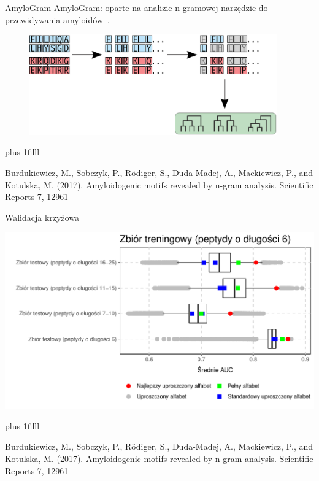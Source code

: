 \documentclass{beamer}\usepackage[]{graphicx}\usepackage[]{color}
\makeatletter
\def\maxwidth{ %
  \ifdim\Gin@nat@width>\linewidth
    \linewidth
  \else
    \Gin@nat@width
  \fi
}
\newenvironment{knitrout}{}{} %
\newcommand{\btVFill}{\vskip0pt plus 1filll}
\makeatother
\begin{document}
\begin{frame}{AmyloGram}
AmyloGram: oparte na analizie n-gramowej narzędzie do przewidywania amyloidów~\citep{burdukiewicz_prediction_2016, BurdukiewiczAmyloidogenicmotifsrevealed2017a}.
\end{frame}


\begin{frame}

\vspace{2cm}

\begin{figure} 
\includegraphics[width=0.95\textwidth]{static_figure/ngram1.eps}
\end{figure}

\btVFill

\tiny{Burdukiewicz, M., Sobczyk, P., Rödiger, S., Duda-Madej, A., Mackiewicz, P., and Kotulska, M. (2017). Amyloidogenic motifs revealed by n-gram analysis. Scientific Reports 7, 12961}

  \end{frame}

\begin{frame}{Walidacja krzyżowa}
\begin{knitrout}
\color{fgcolor}

{\centering \includegraphics[width=\maxwidth]{figure/unnamed-chunk-3-1} 

}



\end{knitrout}
\btVFill

\tiny{Burdukiewicz, M., Sobczyk, P., Rödiger, S., Duda-Madej, A., Mackiewicz, P., and Kotulska, M. (2017). Amyloidogenic motifs revealed by n-gram analysis. Scientific Reports 7, 12961}
\end{frame}
\end{document}
